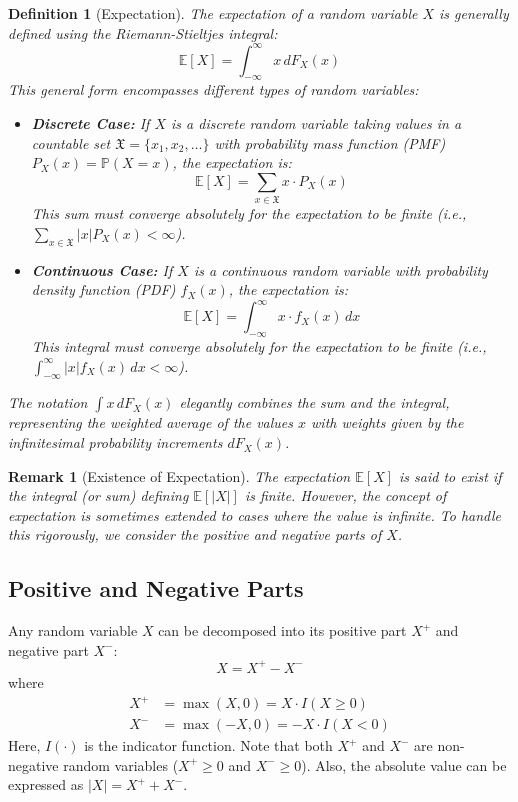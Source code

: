 \documentclass[11pt]{article}
\newtheorem{definition}{Definition}[section] %
\newtheorem{remark}{Remark}[section]         %
\theoremstyle{definition} %
\newcommand{\E}{\mathbb{E}}     %
\newcommand{\Prob}{\mathbb{P}}  %
\newcommand{\Xset}{\mathfrak{X}} %
\begin{document}
\begin{definition}[Expectation]
\label{def:expectation}
The expectation of a random variable $X$ is generally defined using the Riemann-Stieltjes integral:
\begin{equation} \label{eq:general_expectation}
\E[X] = \int_{-\infty}^{\infty} x \, dF_X(x)
\end{equation}
This general form encompasses different types of random variables:
\begin{itemize}
    \item \textbf{Discrete Case:} If $X$ is a discrete random variable taking values in a countable set $\Xset = \{x_1, x_2, \dots\}$ with probability mass function (PMF) $P_X(x) = \Prob(X=x)$, the expectation is:
    \[
    \E[X] = \sum_{x \in \Xset} x \cdot P_X(x)
    \]
    This sum must converge absolutely for the expectation to be finite (i.e., $\sum_{x \in \Xset} |x| P_X(x) < \infty$).

    \item \textbf{Continuous Case:} If $X$ is a continuous random variable with probability density function (PDF) $f_X(x)$, the expectation is:
    \[
    \E[X] = \int_{-\infty}^{\infty} x \cdot f_X(x) \, dx
    \]
    This integral must converge absolutely for the expectation to be finite (i.e., $\int_{-\infty}^{\infty} |x| f_X(x) \, dx < \infty$).
\end{itemize}
The notation $\int x \, dF_X(x)$ elegantly combines the sum and the integral, representing the weighted average of the values $x$ with weights given by the infinitesimal probability increments $dF_X(x)$.
\end{definition}

\begin{remark}[Existence of Expectation]
The expectation $\E[X]$ is said to exist if the integral (or sum) defining $\E[|X|]$ is finite. However, the concept of expectation is sometimes extended to cases where the value is infinite. To handle this rigorously, we consider the positive and negative parts of $X$.
\end{remark}

\subsection{Positive and Negative Parts}
\label{subsec:positive_negative}

Any random variable $X$ can be decomposed into its positive part $X^+$ and negative part $X^-$:
\[
X = X^+ - X^-
\]
where
\begin{align*}
X^+ &= \max(X, 0) = X \cdot I(X \ge 0) \\
X^- &= \max(-X, 0) = -X \cdot I(X < 0)
\end{align*}
Here, $I(\cdot)$ is the indicator function. Note that both $X^+$ and $X^-$ are non-negative random variables ($X^+ \ge 0$ and $X^- \ge 0$). Also, the absolute value can be expressed as $|X| = X^+ + X^-$.
\end{document}
